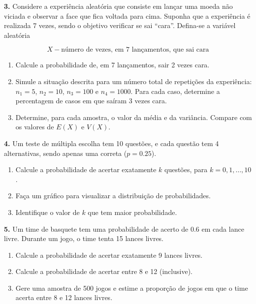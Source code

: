 \documentclass[
]{book}
\providecommand{\tightlist}{%
  \setlength{\itemsep}{0pt}\setlength{\parskip}{0pt}}
\begin{document}
\textbf{3.} Considere a experiência aleatória que consiste em lançar
uma moeda não viciada e observar a face que fica voltada para cima.
Suponha que a experiência é realizada 7 vezes, sendo o objetivo
verificar se sai ``cara''. Defina-se a variável aleatória

\[X - \text{número de vezes, em 7 lançamentos, que sai cara}\]

\begin{enumerate}
\def\labelenumi{(\alph{enumi})}
\item
  Calcule a probabilidade de, em 7 lançamentos, sair 2 vezes cara.
\item
  Simule a situação descrita para um número total de repetições da
  experiência: \(n_1=5\), \(n_2=10\), \(n_3=100\) e \(n_4=1000\). Para cada
  caso, determine a percentagem de casos em que saíram 3 vezes cara.
\item
  Determine, para cada amostra, o valor da média e da variância.
  Compare com os valores de \(E(X)\) e \(V(X)\).
\end{enumerate}

\textbf{4.} Um teste de múltipla escolha tem 10 questões, e cada questão tem 4 alternativas, sendo apenas uma correta (\(p = 0.25\)).

\begin{enumerate}
\def\labelenumi{(\alph{enumi})}
\tightlist
\item
  Calcule a probabilidade de acertar exatamente \(k\) questões, para \(k = 0, 1, \ldots, 10\).
\item
  Faça um gráfico para visualizar a distribuição de probabilidades.
\item
  Identifique o valor de \(k\) que tem maior probabilidade.
\end{enumerate}

\textbf{5.} Um time de basquete tem uma probabilidade de acerto de 0.6 em cada lance livre. Durante um jogo, o time tenta 15 lances livres.

\begin{enumerate}
\def\labelenumi{(\alph{enumi})}
\tightlist
\item
  Calcule a probabilidade de acertar exatamente 9 lances livres.
\item
  Calcule a probabilidade de acertar entre 8 e 12 (inclusive).
\item
  Gere uma amostra de 500 jogos e estime a proporção de jogos em que o time acerta entre 8 e 12 lances livres.
\end{enumerate}
\end{document}
